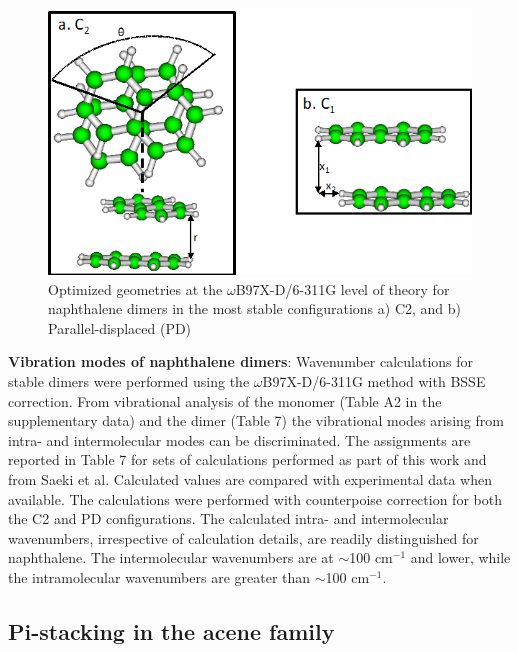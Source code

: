 \begin{figure}[h]
	\centering
	\includegraphics[scale=0.7]{image/napthalene-dimer}
	\caption[Optimized geometries for naphthalene dimers]{Optimized geometries at the $\omega$B97X-D/6-311G level of theory for naphthalene dimers in the most stable configurations a) C2, and b) Parallel-displaced (PD)}
\end{figure}

\textbf{Vibration modes of naphthalene dimers}: Wavenumber calculations for stable dimers were performed using the $\omega$B97X-D/6-311G method with BSSE correction. From vibrational analysis of the monomer (Table A2 in the supplementary data) and the dimer (Table 7) the vibrational modes arising from intra- and intermolecular modes can be discriminated. The assignments are reported in Table 7 for sets of calculations performed as part of this work and from Saeki et al\cite{saeki2006theoretical}. Calculated values are compared with experimental data when available. The calculations were performed with counterpoise correction for both the C2 and PD configurations. The calculated intra- and intermolecular wavenumbers, irrespective of calculation details, are readily distinguished for naphthalene. The intermolecular wavenumbers are at $\sim$100 cm$^{-1}$ and lower, while the intramolecular wavenumbers are greater than $\sim$100 cm$^{-1}$.

\subsection{Pi-stacking in the acene family}

